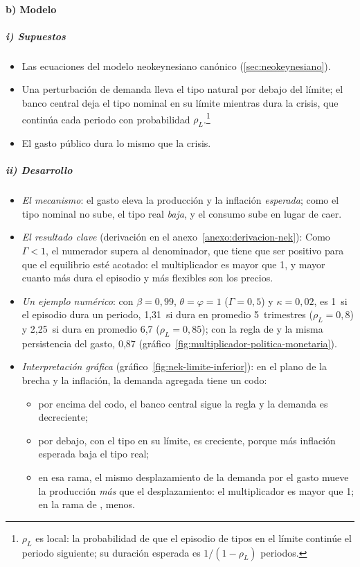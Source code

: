 \documentclass[11pt]{article}
\begin{document}
\paragraph{b) Modelo}

\subparagraph{i) Supuestos}

\begin{itemize}
\item Las ecuaciones del modelo neokeynesiano canónico (\ref{sec:neokeynesiano}).
\item Una perturbación de demanda lleva el tipo natural por debajo del límite; el banco central deja el tipo nominal en su límite mientras dura la crisis, que continúa cada periodo con probabilidad $\rho_L$.\footnote{$\rho_L$ es local: la probabilidad de que el episodio de tipos en el límite continúe el periodo siguiente; su duración esperada es $1/(1-\rho_L)$ periodos.}
\item El gasto público dura lo mismo que la crisis.
\end{itemize}

\subparagraph{ii) Desarrollo}

\begin{itemize}
\item \emph{El mecanismo}: el gasto eleva la producción y la inflación \emph{esperada}; como el tipo nominal no sube, el tipo real \emph{baja}, y el consumo sube en lugar de caer.
\item \emph{El resultado clave} (derivación en el anexo~\ref{anexo:derivacion-nek}):
  Como $\Gamma<1$, el numerador supera al denominador, que tiene que ser positivo para que el equilibrio esté acotado: el multiplicador es mayor que 1, y mayor cuanto más dura el episodio y más flexibles son los precios.
\item \emph{Un ejemplo numérico}: con $\beta=0{,}99$, $\theta=\varphi=1$ ($\Gamma=0{,}5$) y $\kappa=0{,}02$, es 1~si el episodio dura un periodo, 1,31~si dura en promedio 5~trimestres ($\rho_L=0{,}8$) y 2,25~si dura en promedio 6,7 ($\rho_L=0{,}85$); con la regla de  y la misma persistencia del gasto, 0,87 (gráfico~\ref{fig:multiplicador-politica-monetaria}).
\item \emph{Interpretación gráfica} (gráfico~\ref{fig:nek-limite-inferior}): en el plano de la brecha y la inflación, la demanda agregada tiene un codo:
  \begin{itemize}
  \item por encima del codo, el banco central sigue la regla y la demanda es decreciente;
  \item por debajo, con el tipo en su límite, es creciente, porque más inflación esperada baja el tipo real;
  \item en esa rama, el mismo desplazamiento de la demanda por el gasto mueve la producción \emph{más} que el desplazamiento: el multiplicador es mayor que 1; en la rama de , menos.
  \end{itemize}
\end{itemize}
\end{document}
